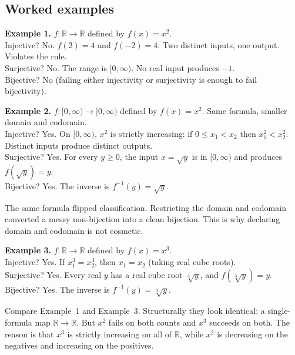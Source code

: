 \subsection*{Worked examples}

\textbf{Example 1.} $f : \mathbb{R} \to \mathbb{R}$ defined by $f(x) = x^2$. \\
Injective? No. $f(2) = 4$ and $f(-2) = 4$. Two distinct inputs, one output. Violates the rule.\\
Surjective? No. The range is $[0, \infty)$. No real input produces $-1$. \\
Bijective? No (failing either injectivity or surjectivity is enough to fail bijectivity).

\textbf{Example 2.} $f : [0, \infty) \to [0, \infty)$ defined by $f(x) = x^2$. Same formula, smaller domain and codomain. \\
Injective? Yes. On $[0, \infty)$, $x^2$ is strictly increasing: if $0 \leq x_1 < x_2$ then $x_1^2 < x_2^2$. Distinct inputs produce distinct outputs. \\
Surjective? Yes. For every $y \geq 0$, the input $x = \sqrt{y}$ is in $[0, \infty)$ and produces $f(\sqrt{y}) = y$. \\
Bijective? Yes. The inverse is $f^{-1}(y) = \sqrt{y}$.

The same formula flipped classification. Restricting the domain and codomain converted a messy non-bijection into a clean bijection. This is why declaring domain and codomain is not cosmetic.

\textbf{Example 3.} $f : \mathbb{R} \to \mathbb{R}$ defined by $f(x) = x^3$. \\
Injective? Yes. If $x_1^3 = x_2^3$, then $x_1 = x_2$ (taking real cube roots). \\
Surjective? Yes. Every real $y$ has a real cube root $\sqrt[3]{y}$, and $f(\sqrt[3]{y}) = y$. \\
Bijective? Yes. The inverse is $f^{-1}(y) = \sqrt[3]{y}$.

Compare Example~1 and Example~3. Structurally they look identical: a single-formula map $\mathbb{R} \to \mathbb{R}$. But $x^2$ fails on both counts and $x^3$ succeeds on both. The reason is that $x^3$ is strictly increasing on all of $\mathbb{R}$, while $x^2$ is decreasing on the negatives and increasing on the positives.



